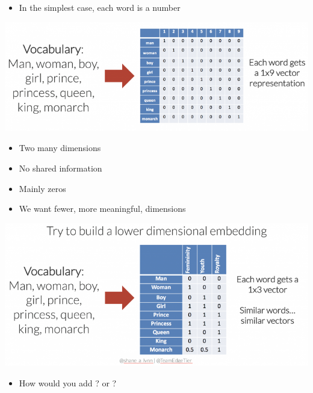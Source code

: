 \documentclass[25pt,a4paper,landscape,headrule,footrule,xetex]{foils}
\begin{document}
\begin{itemize}
\item In the simplest case, each word is a number
\end{itemize}
\includegraphics[width=\linewidth]{../pics/one-hot-word-embedding-vectors-768x276.png}
\begin{itemize}\addtolength{\itemsep}{-2ex}
\item Two many dimensions
\item No shared information
\item Mainly zeros
\end{itemize}
\newpage
\begin{itemize}
\item We want fewer, more meaningful, dimensions
\end{itemize}
\includegraphics[width=\linewidth]{../pics/3-dimensional-word-embeddings-example-768x362.png}

\begin{itemize}
\item How would you add ? or ?
\end{itemize}

\end{document}
